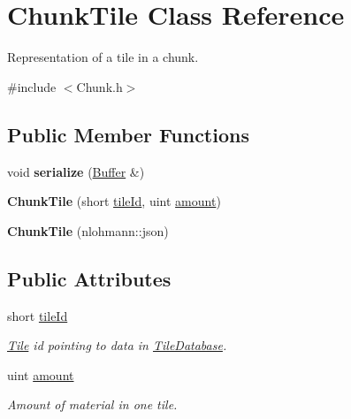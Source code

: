 \hypertarget{classChunkTile}{\section{Chunk\-Tile Class Reference}
\label{classChunkTile}
}


Representation of a tile in a chunk.  




{\ttfamily \#include $<$Chunk.\-h$>$}

\subsection*{Public Member Functions}
\begin{DoxyCompactItemize}
\item 
\hypertarget{classChunkTile_a22837ff1a9d7967e86a64c7664eb53d8}{void {\bfseries serialize} (\hyperlink{classBuffer}{Buffer} \&)}\label{classChunkTile_a22837ff1a9d7967e86a64c7664eb53d8}

\item 
\hypertarget{classChunkTile_a9384499af7d00c6822b7f59d356bd6a3}{{\bfseries Chunk\-Tile} (short \hyperlink{classChunkTile_ac7277fa1d196411449a646d3eed73b39}{tile\-Id}, uint \hyperlink{classChunkTile_a29ac3a16c7075941a5c483f1a3372364}{amount})}\label{classChunkTile_a9384499af7d00c6822b7f59d356bd6a3}

\item 
\hypertarget{classChunkTile_a00633aab2a6285d570f880e4cb216831}{{\bfseries Chunk\-Tile} (nlohmann\-::json)}\label{classChunkTile_a00633aab2a6285d570f880e4cb216831}

\end{DoxyCompactItemize}
\subsection*{Public Attributes}
\begin{DoxyCompactItemize}
\item 
\hypertarget{classChunkTile_ac7277fa1d196411449a646d3eed73b39}{short \hyperlink{classChunkTile_ac7277fa1d196411449a646d3eed73b39}{tile\-Id}}\label{classChunkTile_ac7277fa1d196411449a646d3eed73b39}

\begin{DoxyCompactList}\small\item\em \hyperlink{classTile}{Tile} id pointing to data in \hyperlink{classTileDatabase}{Tile\-Database}. \end{DoxyCompactList}\item 
\hypertarget{classChunkTile_a29ac3a16c7075941a5c483f1a3372364}{uint \hyperlink{classChunkTile_a29ac3a16c7075941a5c483f1a3372364}{amount}}\label{classChunkTile_a29ac3a16c7075941a5c483f1a3372364}

\begin{DoxyCompactList}\small\item\em Amount of material in one tile. \end{DoxyCompactList}\end{DoxyCompactItemize}
